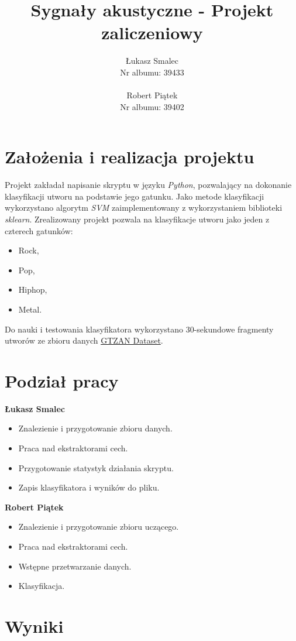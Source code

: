 \documentclass[10pt,a4paper]{article}
\author{Łukasz Smalec \\ Nr albumu: 39433\\
\\Robert Piątek \\ Nr albumu: 39402 }
\title{Sygnały akustyczne - Projekt zaliczeniowy}
\begin{document}
\maketitle
\newpage
\section{Założenia i realizacja projektu}
Projekt zakładał napisanie skryptu w języku \textit{Python}, pozwalający na dokonanie klasyfikacji utworu na podstawie jego gatunku. Jako metode klasyfikacji wykorzystano algorytm \textit{SVM} zaimplementowany z wykorzystaniem biblioteki \textit{sklearn}. Zrealizowany projekt pozwala na klasyfikacje utworu jako jeden z czterech gatunków: 
\begin{itemize}
\item Rock,
\item Pop,
\item Hiphop,
\item Metal.
\end{itemize}
Do nauki i testowania klasyfikatora wykorzystano 30-sekundowe fragmenty utworów ze zbioru danych \href{https://www.kaggle.com/andradaolteanu/gtzan-dataset-music-genre-classification}{GTZAN Dataset}. 

\section{Podział pracy}

\textbf{Łukasz Smalec}
\begin{itemize}
\item Znalezienie i przygotowanie zbioru danych.
\item Praca nad ekstraktorami cech.
\item Przygotowanie statystyk działania skryptu.
\item Zapis klasyfikatora i wyników do pliku.
\end{itemize}

\textbf{Robert Piątek}
\begin{itemize}
\item Znalezienie i przygotowanie zbioru uczącego.
\item Praca nad ekstraktorami cech.
\item Wstępne przetwarzanie danych.
\item Klasyfikacja.
\end{itemize}

\newpage

\section{Wyniki}
\end{document}
